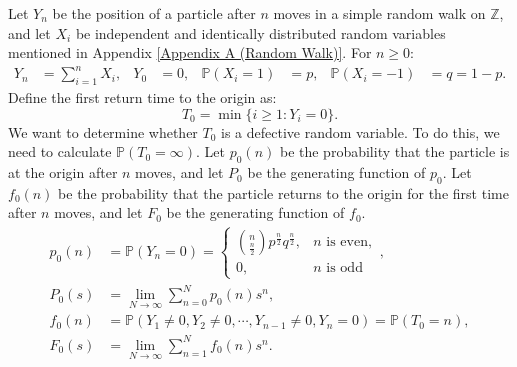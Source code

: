 \documentclass{huhtakm-template-book-v2}
\newcommand{\prob}{\mathbb{P}}
\begin{document}
    \begin{eg}
        \label{Chapter 7 (Example) Simple random walk recurrence and transience}
        Let $Y_{n}$ be the position of a particle after $n$ moves in a simple random walk on $\mathbb{Z}$, and let $X_{i}$ be independent and identically distributed random variables mentioned in Appendix \ref{Appendix A (Random Walk)}. For $n \geq 0$:
        \begin{align*}
            Y_{n} &= \sum_{i = 1}^{n}X_{i}, & Y_{0} &= 0, & \prob(X_{i} = 1) &= p, & \prob(X_{i} = -1) &= q = 1-p.
        \end{align*}
        Define the first return time to the origin as:
        \begin{equation*}
            T_{0} = \min\{i \geq 1:Y_{i} = 0\}.
        \end{equation*}
        We want to determine whether $T_{0}$ is a defective random variable. To do this, we need to calculate $\prob(T_{0} = \infty)$. Let $p_{0}(n)$ be the probability that the particle is at the origin after $n$ moves, and let $P_{0}$ be the generating function of $p_{0}$. Let $f_{0}(n)$ be the probability that the particle returns to the origin for the first time after $n$ moves, and let $F_{0}$ be the generating function of $f_{0}$.
        \begin{align*}
            p_{0}(n) &= \prob(Y_{n} = 0) = \begin{cases}
                \binom{n}{\frac{n}{2}}p^{\frac{n}{2}}q^{\frac{n}{2}}, &n\text{ is even},\\
                0, &n\text{ is odd}
            \end{cases},\\
            P_{0}(s) &= \lim_{N \to \infty}\sum_{n = 0}^{N}p_{0}(n)s^{n},\\
            f_{0}(n) &= \prob(Y_{1} \neq 0,Y_{2} \neq 0,\cdots,Y_{n-1} \neq 0,Y_{n} = 0) = \prob(T_{0} = n),\\
            F_{0}(s) &= \lim_{N \to \infty}\sum_{n = 1}^{N}f_{0}(n)s^{n}.
        \end{align*}
    \end{eg}
    \newpage
\end{document}
